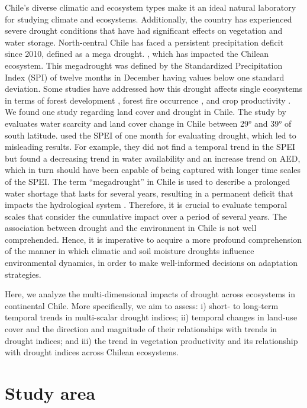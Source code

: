 \documentclass[
  authoryear,
  preprint,
  3p,
  onecolumn]{elsarticle}
\begin{document}
Chile's diverse climatic and ecosystem types
\citep{Beck2023, Luebert2022} make it an ideal natural laboratory for
studying climate and ecosystems. Additionally, the country has
experienced severe drought conditions that have had significant effects
on vegetation and water storage. North-central Chile has faced a
persistent precipitation deficit since 2010, defined as a mega drought.
\citep{Garreaud2017}, which has impacted the Chilean ecosystem. This
megadrought was defined by the Standardized Precipitation Index (SPI) of
twelve months in December having values below one standard deviation.
Some studies have addressed how this drought affects single ecosystems
in terms of forest development \citep{Miranda2020, Venegas2018}, forest
fire occurrence \citep{UrrutiaJalabert2018}, and crop productivity
\citep{Zambrano2023, Zambrano2018, Zambrano2016}. We found one study
regarding land cover and drought in Chile. The study by
\citet{Fuentes2021} evaluates water scarcity and land cover change in
Chile between 29° and 39° of south latitude. \citet{Fuentes2021} used
the SPEI of one month for evaluating drought, which led to misleading
results. For example, they did not find a temporal trend in the SPEI but
found a decreasing trend in water availability and an increase trend on
AED, which in turn should have been capable of being captured with
longer time scales of the SPEI. The term ``megadrought'' in Chile is
used to describe a prolonged water shortage that lasts for several
years, resulting in a permanent deficit that impacts the hydrological
system \citep{Boisier2018}. Therefore, it is crucial to evaluate
temporal scales that consider the cumulative impact over a period of
several years. The association between drought and the environment in
Chile is not well comprehended. Hence, it is imperative to acquire a
more profound comprehension of the manner in which climatic and soil
moisture droughts influence environmental dynamics, in order to make
well-informed decisions on adaptation strategies.

Here, we analyze the multi-dimensional impacts of drought across
ecosystems in continental Chile. More specifically, we aim to assess: i)
short- to long-term temporal trends in multi-scalar drought indices; ii)
temporal changes in land-use cover and the direction and magnitude of
their relationships with trends in drought indices; and iii) the trend
in vegetation productivity and its relationship with drought indices
across Chilean ecosystems.

\hypertarget{study-area}{%
\section{Study area}\label{study-area}}
\end{document}
